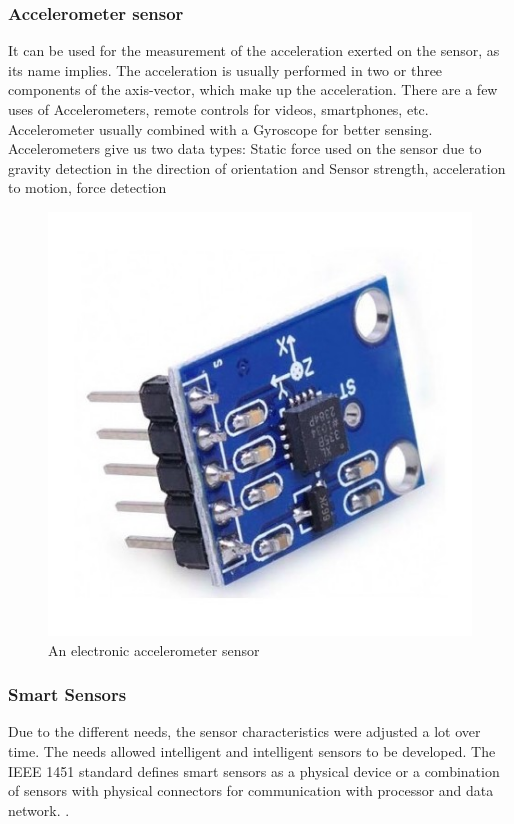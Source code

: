 \subsubsection{Accelerometer sensor}



It can be used for the measurement of the acceleration exerted on the sensor, as its name implies. The acceleration is usually performed in two or three components of the axis-vector, which make up the acceleration. \cite{FERNANDEZ20138} There are a few uses of Accelerometers, remote controls for videos, smartphones, etc. Accelerometer usually combined with a Gyroscope for better sensing. Accelerometers give us two data types: Static force used on the sensor due to gravity detection in the direction of orientation and  Sensor strength, acceleration to motion, force detection

\begin{figure}[h]
  \centering
    \includegraphics[width=0.5\linewidth]{figures/accSensor.jpg}
    \caption{An electronic accelerometer sensor}
\label{fig:accSensor}
\end{figure}



\subsubsection{Smart Sensors}

Due to the different needs, the sensor characteristics were adjusted a lot over time. The needs allowed intelligent and intelligent sensors to be developed. The IEEE 1451 standard defines smart sensors as a physical device or a combination of sensors with physical connectors for communication with processor and data network. \cite{5739775}.

